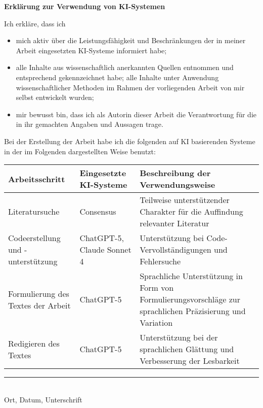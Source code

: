 \clearpage
\thispagestyle{plain} %

{\large\textbf{Erklärung zur Verwendung von \acs{KI}-Systemen}}\par\vspace{0.8\baselineskip}

Ich erkläre, dass ich
\begin{itemize}[leftmargin=2.2em,label=\checkedbox,itemsep=0.45\baselineskip]
  \item mich aktiv über die Leistungsfähigkeit und Beschränkungen der in meiner Arbeit eingesetzten \ac{KI}-Systeme informiert habe;
  \item alle Inhalte aus wissenschaftlich anerkannten Quellen entnommen und entsprechend gekennzeichnet habe; alle Inhalte unter Anwendung wissenschaftlicher Methoden im Rahmen der vorliegenden Arbeit von mir selbst entwickelt wurden;
  \item mir bewusst bin, dass ich als Autorin dieser Arbeit die Verantwortung für die in ihr gemachten Angaben und Aussagen trage.
\end{itemize}

\vspace{0.6\baselineskip}
Bei der Erstellung der Arbeit habe ich die folgenden auf \ac{KI} basierenden Systeme in der im Folgenden dargestellten Weise benutzt:\par\vspace{0.6\baselineskip}

\noindent
\begin{tabularx}{\textwidth}{|p{}|p{}|Y|}
\hline
\textbf{Arbeitsschritt} & \textbf{Eingesetzte \ac{KI}-Systeme} & \textbf{Beschreibung der Verwendungsweise} \\
\hline
Literatursuche & Consensus & Teilweise unterstützender Charakter für die Auffindung relevanter Literatur \\
\hline
Codeerstellung und -unterstützung & ChatGPT-5, Claude Sonnet 4 & Unterstützung bei Code-Vervollständigungen und Fehlersuche \\
\hline
Formulierung des Textes der Arbeit & ChatGPT-5 & Sprachliche Unterstützung in Form von Formulierungsvorschläge zur sprachlichen Präzisierung und Variation \\
\hline
Redigieren des Textes & ChatGPT-5 & Unterstützung bei der sprachlichen Glättung und Verbesserung der Lesbarkeit \\
\hline
\end{tabularx}

\vspace{1.6cm}

\noindent\rule{7cm}{0.4pt}\\
\small Ort, Datum, Unterschrift
\clearpage